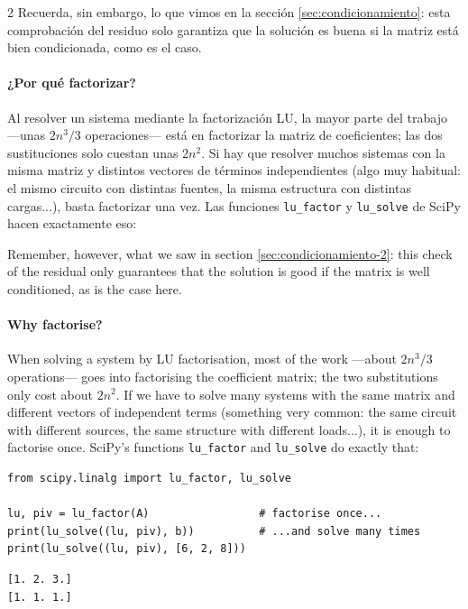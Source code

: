\begin{paracol}{2}
Recuerda, sin embargo, lo que vimos en la sección \ref{sec:condicionamiento}: esta comprobación del residuo solo garantiza que la solución es buena si la matriz está bien condicionada, como es el caso.

\paragraph{¿Por qué factorizar?} Al resolver un sistema mediante la factorización LU, la mayor parte del trabajo ---unas $2n^3/3$ operaciones--- está en factorizar la matriz de coeficientes; las dos sustituciones solo cuestan unas $2n^2$. Si hay que resolver muchos sistemas con la misma matriz y distintos vectores de términos independientes (algo muy habitual: el mismo circuito con distintas fuentes, la misma estructura con distintas cargas...), basta factorizar una vez. Las funciones \texttt{lu\_factor} y \texttt{lu\_solve} de SciPy hacen exactamente eso:

\switchcolumn
Remember, however, what we saw in section \ref{sec:condicionamiento-2}: this check of the residual only guarantees that the solution is good if the matrix is well conditioned, as is the case here.

\paragraph{Why factorise?} When solving a system by LU factorisation, most of the work ---about $2n^3/3$ operations--- goes into factorising the coefficient matrix; the two substitutions only cost about $2n^2$. If we have to solve many systems with the same matrix and different vectors of independent terms (something very common: the same circuit with different sources, the same structure with different loads...), it is enough to factorise once. SciPy's functions \texttt{lu\_factor} and \texttt{lu\_solve} do exactly that:
\end{paracol}

\begin{verbatim}
from scipy.linalg import lu_factor, lu_solve

lu, piv = lu_factor(A)                 # factorise once...
print(lu_solve((lu, piv), b))          # ...and solve many times
print(lu_solve((lu, piv), [6, 2, 8]))
\end{verbatim}
\begin{verbatim}
[1. 2. 3.]
[1. 1. 1.]
\end{verbatim}

